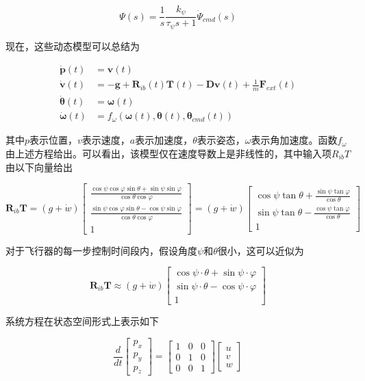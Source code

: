 $$
\Psi(s)=\frac{1}{s} \frac{k_{\psi}}{\tau_{\psi} s+1} \dot{\Psi}_{c m d}(s)
$$

现在，这些动态模型可以总结为

$$
\begin{aligned}
\dot{\boldsymbol{p}}(t) &=\boldsymbol{v}(t) \\
\dot{\boldsymbol{v}}(t) &=-\boldsymbol{g}+\boldsymbol{R}_{i b}(t) \boldsymbol{T}(t)-\boldsymbol{D} \boldsymbol{v}(t)+\frac{1}{m} \boldsymbol{F}_{e x t}(t) \\
\dot{\boldsymbol{\theta}}(t) &=\boldsymbol{\omega}(t) \\
\dot{\boldsymbol{\omega}}(t) &=f_{\omega}\left(\boldsymbol{\omega}(t), \boldsymbol{\theta}(t), \boldsymbol{\theta}_{c m d}(t)\right)
\end{aligned}
$$

其中$p$表示位置，$v$表示速度，$a$表示加速度，$\theta$表示姿态，$\omega$表示角加速度。函数$f_{\omega}$由上述方程给出。可以看出，该模型仅在速度导数上是非线性的，其中输入项$R_{ib}T$由以下向量给出

$$
\boldsymbol{R}_{i b} \boldsymbol{T}=(g+\dot{w})\left[\begin{array}{c}
\frac{\cos \psi \cos \varphi \sin \theta+\sin \psi \sin \varphi}{\cos \theta \cos \varphi} \\
\frac{\sin \psi \cos \varphi \sin \theta-\cos \psi \sin \varphi}{\cos \theta \cos \varphi} \\
1
\end{array}\right]=(g+\dot{w})\left[\begin{array}{c}
\cos \psi \tan \theta+\frac{\sin \psi \tan \varphi}{\cos \theta} \\
\sin \psi \tan \theta-\frac{\cos \psi \tan \varphi}{\cos \theta} \\
1
\end{array}\right]
$$

对于飞行器的每一步控制时间段内，假设角度$\psi$和$\theta$很小，这可以近似为

$$
\boldsymbol{R}_{i b} \boldsymbol{T} \approx(g+\dot{w})\left[\begin{array}{c}
\cos \psi \cdot \theta+\sin \psi \cdot \varphi \\
\sin \psi \cdot \theta-\cos \psi \cdot \varphi \\
1
\end{array}\right]
$$

系统方程在状态空间形式上表示如下

$$
\frac{d}{d t}\left[\begin{array}{l}
p_{x} \\
p_{y} \\
p_{z}
\end{array}\right]=\left[\begin{array}{lll}
1 & 0 & 0 \\
0 & 1 & 0 \\
0 & 0 & 1
\end{array}\right]\left[\begin{array}{c}
u \\
v \\
w
\end{array}\right]
$$

